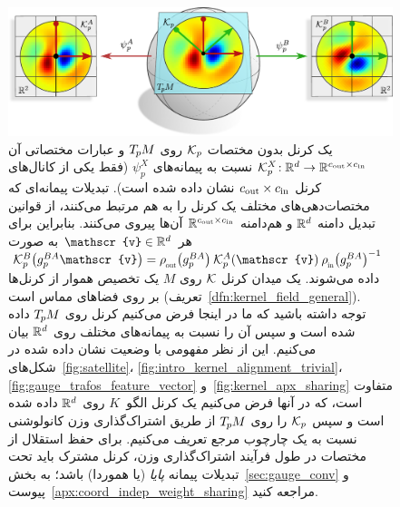 \begin{figure}
	\centering
	\includegraphics[width=.9\columnwidth]{figures/kernel_coordinatization.pdf}
	\caption{\small
		یک کرنل بدون مختصات $\mathcal{K}_p$ روی $T_{\mkern-1.5mu p}\mkern-.5muM$ و عبارات مختصاتی آن ${\mathcal{K}_p^X \!: \mathbb{R}^d \to \mathbb{R}^{{c_\textup{out}}\times{c_\textup{in}}}}$ نسبت به پیمانه‌های $\psi_p^X$ (فقط یکی از کانال‌های کرنل ${{c_\textup{out}} \times {c_\textup{in}}}$ نشان داده شده است).
		تبدیلات پیمانه‌ای که مختصات‌دهی‌های مختلف یک کرنل را به هم مرتبط می‌کنند، از قوانین تبدیل دامنه $\mathbb{R}^d$ و هم‌دامنه $\mathbb{R}^{{c_\textup{out}}\times{c_\textup{in}}}$ آن‌ها پیروی می‌کنند.
		بنابراین برای هر $\mathscr{v} \in \R^d$ به صورت
		$\Kp^B\big(g_p^{BA} \mathscr{v}\big) = \rhoout\big(g_p^{BA}\big) \:\Kp^A (\mathscr{v})\: \rhoin\big(g_p^{BA}\big)^{-1}$ داده می‌شوند.
		یک میدان کرنل $\mathcal{K}$ روی $M$ یک تخصیص هموار از کرنل‌ها بر روی فضاهای مماس است (تعریف~\ref{dfn:kernel_field_general}).
		\\
		توجه داشته باشید که ما در اینجا فرض می‌کنیم کرنل روی $T_{\mkern-1.5mu p}\mkern-.5muM$ داده شده است و سپس آن را نسبت به پیمانه‌های مختلف روی $\mathbb{R}^d$ بیان می‌کنیم.
		این از نظر مفهومی با وضعیت نشان داده شده در
		شکل‌های~\ref{fig:satellite}، \ref{fig:intro_kernel_alignment_trivial}، \ref{fig:gauge_trafos_feature_vector} و~\ref{fig:kernel_apx_sharing} متفاوت است،
		که در آنها فرض می‌کنیم یک کرنل الگو~$K$ روی $\mathbb{R}^d$ داده شده است و سپس $\mathcal{K}_p$ را روی $T_{\mkern-1.5mu p}\mkern-.5muM$ از طریق اشتراک‌گذاری وزن کانولوشنی نسبت به یک چارچوب مرجع تعریف می‌کنیم.
		برای حفظ استقلال از مختصات در طول فرآیند اشتراک‌گذاری وزن، کرنل مشترک باید تحت تبدیلات پیمانه \emph{پایا} (یا هموردا) باشد؛ به بخش~\ref{sec:gauge_conv} و پیوست~\ref{apx:coord_indep_weight_sharing} مراجعه کنید.
	}
	\label{fig:kernel_coordinatization}
\end{figure}


